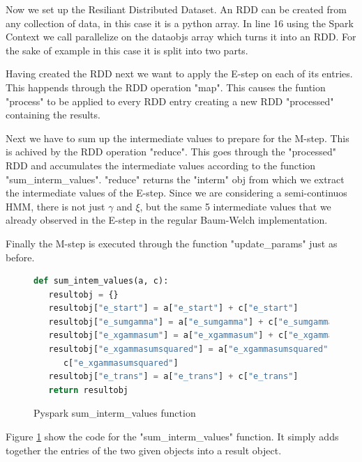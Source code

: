 Now we set up the Resiliant Distributed Dataset. An RDD can be created from any collection of data, in this case it is a python array. In line 16 using the Spark Context we call parallelize on the dataobjs array which turns it into an RDD. For the sake of example in this case it is split into two parts. 

Having created the RDD next we want to apply the E-step on each of its entries. This happends through the RDD operation "map". This causes the funtion "process" to be applied to every RDD entry creating a new RDD "processed" containing the results. 

Next we have to sum up the intermediate values to prepare for the M-step. This is achived by the RDD operation "reduce". This goes through the "processed" RDD and accumulates the intermediate values according to the function "sum\_interm\_values". "reduce" returns the "interm" obj from which we extract the intermediate values of the E-step. Since we are considering a semi-continuos HMM, there is not just $\gamma$ and $\xi$, but the same 5 intermediate values that we already observed in the E-step in the regular Baum-Welch implementation. 

Finally the M-step is executed through the function "update\_params" just as before. 

\begin{figure}
\begin{singlespace}
\begin{lstlisting}[language=Python]
def sum_intem_values(a, c):
   resultobj = {}
   resultobj["e_start"] = a["e_start"] + c["e_start"]
   resultobj["e_sumgamma"] = a["e_sumgamma"] + c["e_sumgamma"]
   resultobj["e_xgammasum"] = a["e_xgammasum"] + c["e_xgammasum"]
   resultobj["e_xgammasumsquared"] = a["e_xgammasumsquared"] + \
      c["e_xgammasumsquared"]
   resultobj["e_trans"] = a["e_trans"] + c["e_trans"]
   return resultobj
\end{lstlisting}
\end{singlespace}
\caption{Pyspark sum\_interm\_values function}    
\label{fig:pyspark-sum-listing}
\end{figure}

Figure \ref{fig:pyspark-sum-listing} show the code for the "sum\_interm\_values" function. It simply adds together the entries of the two given objects into a result object. 

